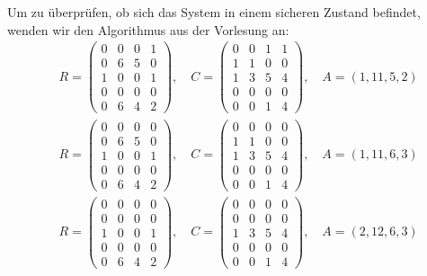 \documentclass[numbers=noendperiod]{scrartcl}
\begin{document}
\begin{enumerate}[a)]
	Um zu überprüfen, ob sich das System in einem sicheren Zustand befindet, wenden wir den Algorithmus aus der Vorlesung an:
	\begin{align}
		&R = \begin{pmatrix}
		0 & 0 & 0 & 1\\
		0 & 6 & 5 & 0\\
		1 & 0 & 0 & 1\\
		0 & 0 & 0 & 0\\
		0 & 6 & 4 & 2
		\end{pmatrix},\quad C = \begin{pmatrix}
		0 & 0 & 1 & 1\\
		1 & 1 & 0 & 0\\
		1 & 3 & 5 & 4\\
		0 & 0 & 0 & 0\\
		0 & 0 & 1 & 4
		\end{pmatrix}, \quad A = (1,11,5,2)\\
		&R = \begin{pmatrix}
		0 & 0 & 0 & 0\\
		0 & 6 & 5 & 0\\
		1 & 0 & 0 & 1\\
		0 & 0 & 0 & 0\\
		0 & 6 & 4 & 2
		\end{pmatrix},\quad C = \begin{pmatrix}
		0 & 0 & 0 & 0\\
		1 & 1 & 0 & 0\\
		1 & 3 & 5 & 4\\
		0 & 0 & 0 & 0\\
		0 & 0 & 1 & 4
		\end{pmatrix}, \quad A = (1,11,6,3)\\
		&R = \begin{pmatrix}
		0 & 0 & 0 & 0\\
		0 & 0 & 0 & 0\\
		1 & 0 & 0 & 1\\
		0 & 0 & 0 & 0\\
		0 & 6 & 4 & 2
		\end{pmatrix},\quad C = \begin{pmatrix}
		0 & 0 & 0 & 0\\
		0 & 0 & 0 & 0\\
		1 & 3 & 5 & 4\\
		0 & 0 & 0 & 0\\
		0 & 0 & 1 & 4
		\end{pmatrix}, \quad A = (2,12,6,3)
	\end{align}
	\begin{align}

\end{align}
\end{enumerate}
\end{document}
